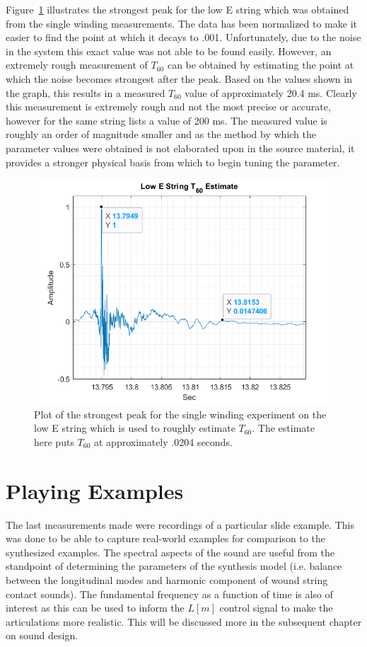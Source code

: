 \documentclass[../main.tex]{subfiles}
\begin{document}
Figure~\ref{fig:T60Measurement} illustrates the strongest peak for the low E string which was obtained from the single winding measurements. The data has been normalized to make it easier to find the point at which it decays to .001. Unfortunately, due to the noise in the system this exact value was not able to be found easily. However, an extremely rough measurement of $T_{60}$ can be obtained by estimating the point at which the noise becomes strongest after the peak. Based on the values shown in the graph, this results in a measured $T_{60}$ value of approximately 20.4 ms. Clearly this measurement is extremely rough and not the most precise or accurate, however for the same string  lists a value of 200 ms. The measured value is roughly an order of magnitude smaller and as the method by which the parameter values were obtained is not elaborated upon in the source material, it provides a stronger physical basis from which to begin tuning the parameter.

\begin{figure}[h!]
    \centering
    \includegraphics[scale=.60]{./images/plots/T60Attempt.png}
    \caption{Plot of the strongest peak for the single winding experiment on the low E string which is used to roughly estimate $T_{60}$. The estimate here puts $T_{60}$ at approximately .0204 seconds.}
    \label{fig:T60Measurement}
\end{figure}

\clearpage

\section{Playing Examples}
 The last measurements made were recordings of a particular slide example. This was done to be able to capture real-world examples for comparison to the synthesized examples. The spectral aspects of the sound are useful from the standpoint of determining the parameters of the synthesis model (i.e. balance between the longitudinal modes and harmonic component of wound string contact sounds). The fundamental frequency as a function of time is also of interest as this can be used to inform the $L[m]$ control signal to make the articulations more realistic. This will be discussed more in the subsequent chapter on sound design.
\end{document}
